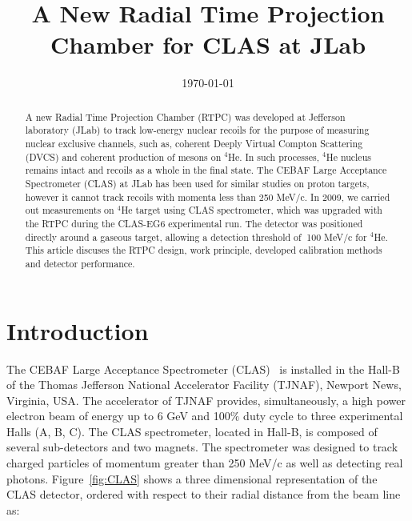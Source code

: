 \documentclass[twocolumn,showpacs,superscriptaddress,groupedaddress]{revtex4}
\begin{document}

\title{\vspace{-15mm}\fontsize{24pt}{10pt}\selectfont\textbf{A New Radial Time 
Projection Chamber for CLAS at JLab}}
  

\date{\today}

\begin{abstract}
A new Radial Time Projection Chamber (RTPC) was developed at Jefferson 
laboratory (JLab) to track low-energy nuclear recoils for the purpose of 
measuring nuclear exclusive channels, such as, coherent Deeply Virtual Compton 
Scattering (DVCS) and coherent production of mesons on $^4$He. In such 
processes, $^4$He nucleus remains intact and recoils as a whole in the final 
state. The CEBAF Large Acceptance Spectrometer (CLAS) at JLab has been used for 
similar studies on proton targets, however it cannot track recoils with momenta 
less than 250 MeV/c. In 2009, we carried out measurements on $^4$He target 
using CLAS spectrometer, which was upgraded with the RTPC during the CLAS-EG6 
experimental run. The detector was positioned directly around a gaseous target, 
allowing a detection threshold of $~$100  MeV/c for $^4$He. This article 
discuses the RTPC design, work principle, developed calibration methods and 
detector performance.
\end{abstract}

\maketitle


\section{Introduction} \label{sec:level1}

The CEBAF Large Acceptance Spectrometer (CLAS)~\cite{CLASref} is installed in 
the Hall-B of the Thomas Jefferson National Accelerator Facility (TJNAF), 
Newport News, Virginia, USA. The accelerator of TJNAF provides, simultaneously, 
a high power electron beam of energy up to 6 GeV and 100$\%$ duty cycle to 
three experimental Halls (A, B, C). The CLAS spectrometer, located in Hall-B, 
is composed of several sub-detectors and two magnets. The spectrometer was 
designed to track charged particles of momentum greater than 250 MeV/c as well 
as detecting real photons. Figure~\ref{fig:CLAS} shows a three dimensional 
representation of the CLAS detector, ordered with respect to their radial 
distance from the beam line as:
\end{document}
